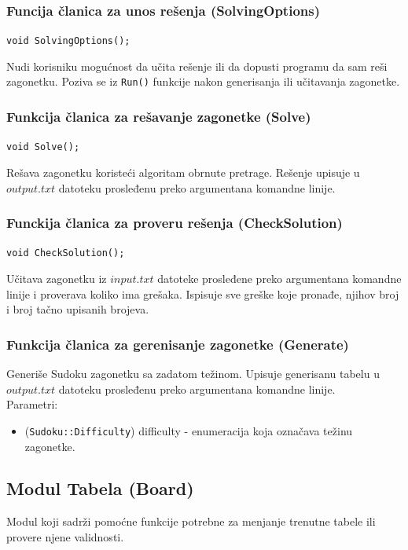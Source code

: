 \documentclass[a4paper]{article}
\begin{document}
    \subsubsection{Funcija članica za unos rešenja (SolvingOptions)}
    \texttt{void SolvingOptions();}
    \par Nudi korisniku mogućnost da učita rešenje ili da dopusti programu da sam reši zagonetku. Poziva se  iz \texttt{Run()} funkcije nakon generisanja 
    ili učitavanja zagonetke.

    \subsubsection{Funkcija članica za rešavanje zagonetke (Solve)}
    \texttt{void Solve();}
    \par Rešava zagonetku koristeći algoritam obrnute pretrage. Rešenje upisuje u $output.txt$ datoteku prosleđenu preko argumentana komandne linije.

    \subsubsection{Funckija članica za proveru rešenja (CheckSolution)}
    \texttt{void CheckSolution();}
    \par Učitava zagonetku iz $input.txt$ datoteke prosleđene preko argumentana komandne linije i proverava koliko ima grešaka. Ispisuje sve greške koje pronađe, njihov broj i broj tačno upisanih brojeva.

    \subsubsection{Funkcija članica za gerenisanje zagonetke (Generate)}
    \par Generiše Sudoku zagonetku sa zadatom težinom. Upisuje generisanu tabelu u $output.txt$ datoteku prosleđenu preko argumentana komandne linije.\\
    Parametri:
    \begin{itemize}
        \item (\texttt{Sudoku::Difficulty}) difficulty - enumeracija koja označava težinu zagonetke.
    \end{itemize}
   
    \subsection{Modul Tabela (Board)}
    Modul koji sadrži pomoćne funkcije potrebne za menjanje trenutne tabele ili provere njene validnosti.
\end{document}
